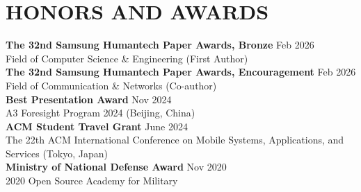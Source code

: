 \section*{HONORS AND AWARDS}

\noindent
\textbf{The 32nd Samsung Humantech Paper Awards, Bronze} \hfill Feb 2026\\
Field of Computer Science \& Engineering (First Author)\\

\noindent
\textbf{The 32nd Samsung Humantech Paper Awards, Encouragement} \hfill Feb 2026\\
Field of Communication \& Networks (Co-author)\\

\noindent
\textbf{Best Presentation Award} \hfill Nov 2024 \\
A3 Foresight Program 2024 (Beijing, China) \\

\noindent
\textbf{ACM Student Travel Grant} \hfill June 2024 \\
The 22th ACM International Conference on Mobile Systems, Applications, and Services (Tokyo, Japan) \\

\noindent
\textbf{Ministry of National Defense Award} \hfill Nov 2020 \\
2020 Open Source Academy for Military \\